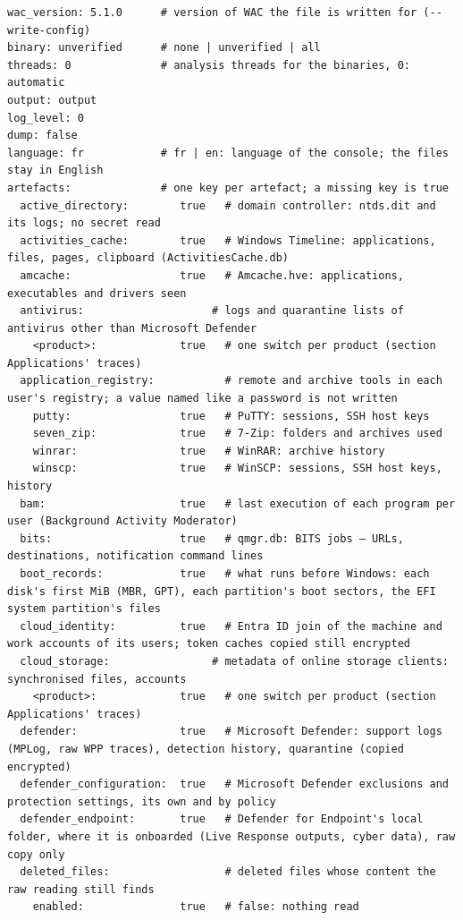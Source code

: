 \documentclass[11pt,a4paper,oneside]{report}
\begin{document}
\begin{lstlisting}
wac_version: 5.1.0      # version of WAC the file is written for (--write-config)
binary: unverified      # none | unverified | all
threads: 0              # analysis threads for the binaries, 0: automatic
output: output
log_level: 0
dump: false
language: fr            # fr | en: language of the console; the files stay in English
artefacts:              # one key per artefact; a missing key is true
  active_directory:        true   # domain controller: ntds.dit and its logs; no secret read
  activities_cache:        true   # Windows Timeline: applications, files, pages, clipboard (ActivitiesCache.db)
  amcache:                 true   # Amcache.hve: applications, executables and drivers seen
  antivirus:                    # logs and quarantine lists of antivirus other than Microsoft Defender
    <product>:             true   # one switch per product (section Applications' traces)
  application_registry:           # remote and archive tools in each user's registry; a value named like a password is not written
    putty:                 true   # PuTTY: sessions, SSH host keys
    seven_zip:             true   # 7-Zip: folders and archives used
    winrar:                true   # WinRAR: archive history
    winscp:                true   # WinSCP: sessions, SSH host keys, history
  bam:                     true   # last execution of each program per user (Background Activity Moderator)
  bits:                    true   # qmgr.db: BITS jobs — URLs, destinations, notification command lines
  boot_records:            true   # what runs before Windows: each disk's first MiB (MBR, GPT), each partition's boot sectors, the EFI system partition's files
  cloud_identity:          true   # Entra ID join of the machine and work accounts of its users; token caches copied still encrypted
  cloud_storage:                # metadata of online storage clients: synchronised files, accounts
    <product>:             true   # one switch per product (section Applications' traces)
  defender:                true   # Microsoft Defender: support logs (MPLog, raw WPP traces), detection history, quarantine (copied encrypted)
  defender_configuration:  true   # Microsoft Defender exclusions and protection settings, its own and by policy
  defender_endpoint:       true   # Defender for Endpoint's local folder, where it is onboarded (Live Response outputs, cyber data), raw copy only
  deleted_files:                  # deleted files whose content the raw reading still finds
    enabled:               true   # false: nothing read

\end{lstlisting}
\end{document}
